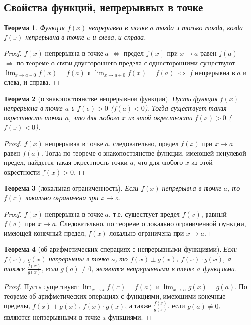\documentclass[a4paper,12pt]{article} %
\newtheorem{theorem}{Теорема}[section]
\theoremstyle{remark}
\theoremstyle{definition}
\begin{document}
\subsection{Свойства функций, непрерывных в точке}
\begin{theorem}
	Функция $f(x)$ непрерывна в точке $a$ тогда и только тогда, когда $f(x)$ непрерывна в точке $a$ и слева, и справа.
\end{theorem}
\begin{proof}
	$f(x)$ непрерывна в точке $a$ $\iff$ предел $f(x)$ при $x\to a$ равен $f(a)$ $\iff$ по теореме о связи двустороннего предела с односторонними существуют $\lim_{x \to a-0} f(x) = f(a)$ и $\lim_{x \to a+0} f(x) = f(a)$ $\iff$ $f$ непрерывна в $a$ и слева, и справа.
\end{proof}

\begin{theorem}[о знакопостоянстве непрерывной функции]
	Пусть функция $f(x)$ непрерывна в точке $a$ и $f(a)>0$ ($f(a)<0$). Тогда существует такая окрестность точки $a$, что для любого $x$ из этой окрестности $f(x)>0$ ($f(x)<0$).
\end{theorem}
\begin{proof}
    $f(x)$ непрерывна в точке $a$, следовательно, предел $f(x)$ при $x\to a$ равен $f(a)$. Тогда по теореме о знакопостоянстве функции, имеющей ненулевой предел, найдется такая окрестность точки $a$, что для любого $x$ из этой окрестности $f(x) > 0$.
\end{proof}

\begin{theorem}[локальная ограниченность]
	Если $f(x)$ непрерывна в точке $a$, то $f(x)$ локально ограничена при $x\to a$.
\end{theorem}
\begin{proof}
    $f(x)$ непрерывна в точке $a$, т.е. существует предел $f(x)$, равный $f(a)$ при $x\to a$. Следовательно, по теореме о локально ограниченной функции, имеющей конечный предел, $f(x)$ локально ограничена при $x\to a$. 
\end{proof}

\begin{theorem}[об арифметических операциях с непрерывными функциями]
    Если $f(x)$, $g(x)$ непрерывны в точке $a$, то $f(x)\pm g(x)$, $f(x)\cdot g(x)$, а также $\frac{f(x)}{g(x)}$, если $g(a)\neq 0$, являются непрерывными в точке $a$ функциями.
\end{theorem}
\begin{proof}
    Пусть существуют $\displaystyle \lim_{x \to a} f(x) = f(a)$ и $\displaystyle \lim_{x \to a} g(x) = g(a)$. По теореме об арифметических операциях с функциями, имеющими конечные пределы, $f(x)\pm g(x)$, $f(x)\cdot g(x)$, а также $\frac{f(x)}{g(x)}$, если $g(a)\neq 0$, являются непрерывными в точке $a$ функциями.
\end{proof}
\end{document}
